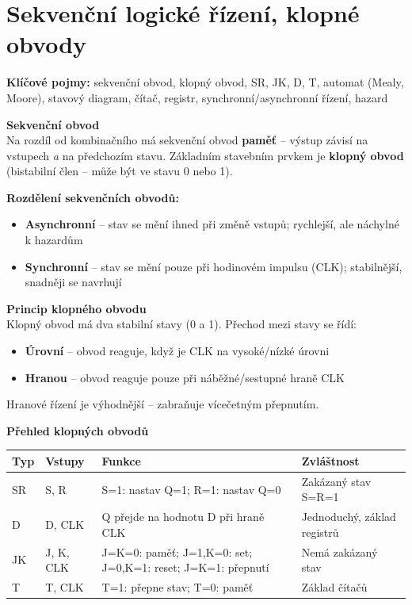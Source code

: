 \documentclass[a4paper,10pt]{article}
\begin{document}
\section{Sekvenční logické řízení, klopné obvody}

\begin{pojmybox}
\textbf{Klíčové pojmy:}
sekvenční obvod, klopný obvod, SR, JK, D, T,
automat (Mealy, Moore), stavový diagram, čítač, registr,
synchronní/asynchronní řízení, hazard
\end{pojmybox}

\begin{vysvetlenibox}
\textbf{Sekvenční obvod}\\
Na rozdíl od kombinačního má sekvenční obvod \textbf{paměť} -- výstup závisí
na vstupech \textit{a} na předchozím stavu. Základním stavebním prvkem je
\textbf{klopný obvod} (bistabilní člen -- může být ve stavu 0 nebo 1).

\textbf{Rozdělení sekvenčních obvodů:}
\begin{itemize}[noitemsep, leftmargin=1.4em, topsep=4pt]
    \item \textbf{Asynchronní} -- stav se mění ihned při změně vstupů;
          rychlejší, ale náchylné k hazardům
    \item \textbf{Synchronní} -- stav se mění pouze při hodinovém impulsu (CLK);
          stabilnější, snadněji se navrhují
\end{itemize}

\textbf{Princip klopného obvodu}\\
Klopný obvod má dva stabilní stavy (0 a 1). Přechod mezi stavy se řídí:
\begin{itemize}[noitemsep, leftmargin=1.4em, topsep=4pt]
    \item \textbf{Úrovní} -- obvod reaguje, když je CLK na vysoké/nízké úrovni
    \item \textbf{Hranou} -- obvod reaguje pouze při náběžné/sestupné hraně CLK
\end{itemize}
Hranové řízení je výhodnější -- zabraňuje vícečetným přepnutím.

\textbf{Přehled klopných obvodů}

\begin{center}
\begin{tabularx}{0.95\linewidth}{@{} l l X l @{}}
    \toprule
    \textbf{Typ} & \textbf{Vstupy} & \textbf{Funkce} & \textbf{Zvláštnost} \\
    \midrule
    SR  & S, R       & S=1: nastav Q=1; R=1: nastav Q=0
                     & Zakázaný stav S=R=1 \\
    D   & D, CLK     & Q přejde na hodnotu D při hraně CLK
                     & Jednoduchý, základ registrů \\
    JK  & J, K, CLK  & J=K=0: paměť; J=1,K=0: set; J=0,K=1: reset;
                       J=K=1: přepnutí
                     & Nemá zakázaný stav \\
    T   & T, CLK     & T=1: přepne stav; T=0: paměť
                     & Základ čítačů \\
    \bottomrule
\end{tabularx}
\end{center}


\end{vysvetlenibox}
\end{document}
